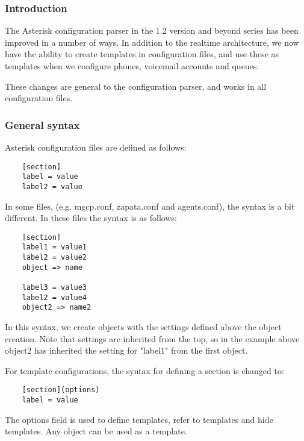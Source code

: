 \subsubsection{Introduction}

The Asterisk configuration parser in the 1.2 version
and beyond series has been improved in a number of ways. In
addition to the realtime architecture, we now have the ability to create
templates in configuration files, and use these as templates when we
configure phones, voicemail accounts and queues.

These changes are general to the configuration parser, and works in
all configuration files.

\subsubsection{General syntax}
Asterisk configuration files are defined as follows:

\begin{astlisting}
\begin{verbatim}
	[section]
	label = value
	label2 = value
\end{verbatim}
\end{astlisting}

In some files, (e.g. mgcp.conf, zapata.conf and agents.conf), the syntax
is a bit different. In these files the syntax is as follows:
	
\begin{astlisting}
\begin{verbatim}
	[section]
	label1 = value1
	label2 = value2
	object => name

	label3 = value3
	label2 = value4
	object2 => name2
\end{verbatim}
\end{astlisting}

In this syntax, we create objects with the settings defined above the object
creation. Note that settings are inherited from the top, so in the example
above object2 has inherited the setting for "label1" from the first object.

For template configurations, the syntax for defining a section is changed
to:
\begin{astlisting}
\begin{verbatim}
	[section](options)
	label = value
\end{verbatim}
\end{astlisting}

The options field is used to define templates, refer to templates and hide
templates. Any object can be used as a template.

